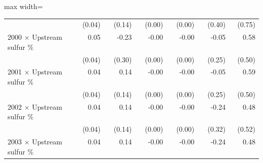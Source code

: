 \begin{table}[htbp]
{\begin{adjustbox}{max width=\linewidth}
\begin{tabular}{lrrrrrr}
 & (\phantom{-}0.04)\phantom{$^{***}$} & (\phantom{-}0.14)\phantom{$^{***}$} & (\phantom{-}0.00)\phantom{$^{***}$} & (\phantom{-}0.00)\phantom{$^{***}$} & (\phantom{-}0.40)\phantom{$^{***}$} & (\phantom{-}0.75)\phantom{$^{***}$} \\
2000 $\times$ Upstream sulfur \% & \phantom{(}\phantom{-}0.05$^{\phantom{*}\phantom{*}\phantom{*}}$ & \phantom{(}-0.23$^{\phantom{*}\phantom{*}\phantom{*}}$ & \phantom{(}-0.00$^{\phantom{*}\phantom{*}\phantom{*}}$ & \phantom{(}-0.00$^{\phantom{*}\phantom{*}\phantom{*}}$ & \phantom{(}-0.05$^{\phantom{*}\phantom{*}\phantom{*}}$ & \phantom{(}\phantom{-}0.58$^{\phantom{*}\phantom{*}\phantom{*}}$ \\
 & (\phantom{-}0.04)\phantom{$^{***}$} & (\phantom{-}0.30)\phantom{$^{***}$} & (\phantom{-}0.00)\phantom{$^{***}$} & (\phantom{-}0.00)\phantom{$^{***}$} & (\phantom{-}0.25)\phantom{$^{***}$} & (\phantom{-}0.50)\phantom{$^{***}$} \\
2001 $\times$ Upstream sulfur \% & \phantom{(}\phantom{-}0.04$^{\phantom{*}\phantom{*}\phantom{*}}$ & \phantom{(}\phantom{-}0.14$^{\phantom{*}\phantom{*}\phantom{*}}$ & \phantom{(}-0.00$^{\phantom{*}\phantom{*}\phantom{*}}$ & \phantom{(}-0.00$^{\phantom{*}\phantom{*}\phantom{*}}$ & \phantom{(}-0.05$^{\phantom{*}\phantom{*}\phantom{*}}$ & \phantom{(}\phantom{-}0.59$^{\phantom{*}\phantom{*}\phantom{*}}$ \\
 & (\phantom{-}0.04)\phantom{$^{***}$} & (\phantom{-}0.14)\phantom{$^{***}$} & (\phantom{-}0.00)\phantom{$^{***}$} & (\phantom{-}0.00)\phantom{$^{***}$} & (\phantom{-}0.25)\phantom{$^{***}$} & (\phantom{-}0.50)\phantom{$^{***}$} \\
2002 $\times$ Upstream sulfur \% & \phantom{(}\phantom{-}0.04$^{\phantom{*}\phantom{*}\phantom{*}}$ & \phantom{(}\phantom{-}0.14$^{\phantom{*}\phantom{*}\phantom{*}}$ & \phantom{(}-0.00$^{\phantom{*}\phantom{*}\phantom{*}}$ & \phantom{(}-0.00$^{\phantom{*}\phantom{*}\phantom{*}}$ & \phantom{(}-0.24$^{\phantom{*}\phantom{*}\phantom{*}}$ & \phantom{(}\phantom{-}0.48$^{\phantom{*}\phantom{*}\phantom{*}}$ \\
 & (\phantom{-}0.04)\phantom{$^{***}$} & (\phantom{-}0.14)\phantom{$^{***}$} & (\phantom{-}0.00)\phantom{$^{***}$} & (\phantom{-}0.00)\phantom{$^{***}$} & (\phantom{-}0.32)\phantom{$^{***}$} & (\phantom{-}0.52)\phantom{$^{***}$} \\
2003 $\times$ Upstream sulfur \% & \phantom{(}\phantom{-}0.04$^{\phantom{*}\phantom{*}\phantom{*}}$ & \phantom{(}\phantom{-}0.14$^{\phantom{*}\phantom{*}\phantom{*}}$ & \phantom{(}-0.00$^{\phantom{*}\phantom{*}\phantom{*}}$ & \phantom{(}-0.00$^{\phantom{*}\phantom{*}\phantom{*}}$ & \phantom{(}-0.24$^{\phantom{*}\phantom{*}\phantom{*}}$ & \phantom{(}\phantom{-}0.48$^{\phantom{*}\phantom{*}\phantom{*}}$ \\

\end{tabular}
\end{adjustbox}}
\end{table}
